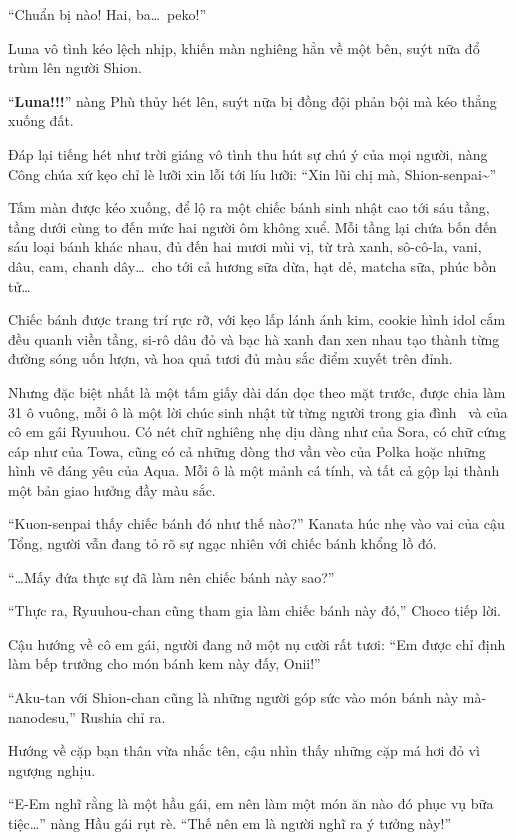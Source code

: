 \documentclass[../main.tex]{subfiles}
\begin{document}
``Chuẩn bị nào! Hai, ba\dots\ peko!''

Luna vô tình kéo lệch nhịp, khiến màn nghiêng hẳn về một bên, suýt nữa đổ trùm lên người Shion.

``\textbf{Luna!!!}'' nàng Phù thủy hét lên, suýt nữa bị đồng đội phản bội mà kéo thẳng xuống đất.

Đáp lại tiếng hét như trời giáng vô tình thu hút sự chú ý của mọi người, nàng Công chúa xứ kẹo chỉ lè lưỡi xin lỗi tới líu lưỡi: ``Xin lũi chị mà, Shion-senpai\~{}''

Tấm màn được kéo xuống, để lộ ra một chiếc bánh sinh nhật cao tới sáu tầng, tầng dưới cùng to đến mức hai người ôm không xuể. Mỗi tầng lại chứa bốn đến sáu loại bánh khác nhau, đủ đến hai mươi mùi vị, từ trà xanh, sô-cô-la, vani, dâu, cam, chanh dây\dots\ cho tới cả hương sữa dừa, hạt dẻ, matcha sữa, phúc bồn tử\dots

Chiếc bánh được trang trí rực rỡ, với kẹo lấp lánh ánh kim, cookie hình idol cắm đều quanh viền tầng, si-rô dâu đỏ và bạc hà xanh đan xen nhau tạo thành từng đường sóng uốn lượn, và hoa quả tươi đủ màu sắc điểm xuyết trên đỉnh.

Nhưng đặc biệt nhất là một tấm giấy dài dán dọc theo mặt trước, được chia làm 31 ô vuông, mỗi ô là một lời chúc sinh nhật từ từng người trong gia đình \hll\ và của cô em gái Ryuuhou. Có nét chữ nghiêng nhẹ dịu dàng như của Sora, có chữ cứng cáp như của Towa, cũng có cả những dòng thơ vần vèo của Polka hoặc những hình vẽ đáng yêu của Aqua. Mỗi ô là một mảnh cá tính, và tất cả gộp lại thành một bản giao hưởng đầy màu sắc.

``Kuon-senpai thấy chiếc bánh đó như thế nào?'' Kanata húc nhẹ vào vai của cậu Tổng, người vẫn đang tỏ rõ sự ngạc nhiên với chiếc bánh khổng lồ đó.

``\dots Mấy đứa thực sự đã làm nên chiếc bánh này sao?''

``Thực ra, Ryuuhou-chan cũng tham gia làm chiếc bánh này đó,'' Choco tiếp lời.

Cậu hướng về cô em gái, người đang nở một nụ cười rất tươi: ``Em được chỉ định làm bếp trưởng cho món bánh kem này đấy, Onii!''

``Aku-tan với Shion-chan cũng là những người góp sức vào món bánh này mà-nanodesu,'' Rushia chỉ ra.

Hướng về cặp bạn thân vừa nhắc tên, cậu nhìn thấy những cặp má hơi đỏ vì ngượng nghịu.

``E-Em nghĩ rằng là một hầu gái, em nên làm một món ăn nào đó phục vụ bữa tiệc\dots'' nàng Hầu gái rụt rè. ``Thế nên em là người nghĩ ra ý tưởng này!''
\end{document}

